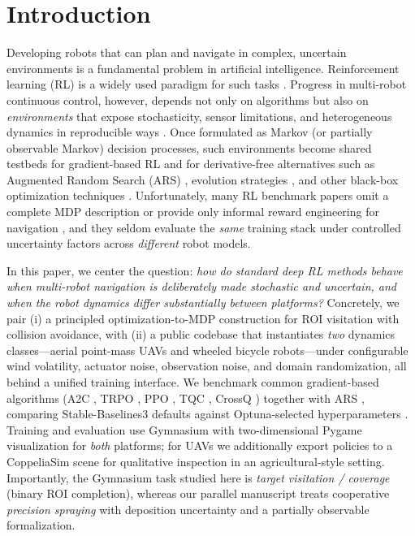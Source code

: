 \documentclass{article}
\begin{document}
\section{Introduction}
\label{sec:intro}
Developing robots that can plan and navigate in complex, uncertain environments is a fundamental problem in artificial intelligence. Reinforcement learning (RL) is a widely used paradigm for such tasks \citep{chen2017icra, everett2018iros, long2017iral, fan2020ijrr, han2022iral}. Progress in multi-robot continuous control, however, depends not only on algorithms but also on \emph{environments} that expose stochasticity, sensor limitations, and heterogeneous dynamics in reproducible ways \citep{brockman2016openai, islam2017reproducibility, mania2018ars, dulacArnold2021, sutton2018reinforcement}. Once formulated as Markov (or partially observable Markov) decision processes, such environments become shared testbeds for gradient-based RL and for derivative-free alternatives such as Augmented Random Search (ARS) \citep{mania2018ars}, evolution strategies \citep{salimans2017}, and other black-box optimization techniques \citep{risi2015neuroevolution}. Unfortunately, many RL benchmark papers omit a complete MDP description \citep{kurach2020google, zhang2019cityflow} or provide only informal reward engineering for navigation \citep{chen2017icra, everett2018iros, long2017iral, fan2020ijrr, han2022iral}, and they seldom evaluate the \emph{same} training stack under controlled uncertainty factors across \emph{different} robot models.

In this paper, we center the question: \emph{how do standard deep RL methods behave when multi-robot navigation is deliberately made stochastic and uncertain, and when the robot dynamics differ substantially between platforms?} Concretely, we pair (i) a principled optimization-to-MDP construction for ROI visitation with collision avoidance, with (ii) a public codebase that instantiates \emph{two} dynamics classes---aerial point-mass UAVs and wheeled bicycle robots---under configurable wind volatility, actuator noise, observation noise, and domain randomization, all behind a unified training interface. We benchmark common gradient-based algorithms (A2C \citep{mnih2016a2c}, TRPO \citep{schulman2015trust}, PPO \citep{schulman2017ppo}, TQC \citep{kuznetsov2020tqc}, CrossQ \citep{bhatt2024crossq}) together with ARS \citep{mania2018ars}, comparing Stable-Baselines3 defaults against Optuna-selected hyperparameters \citep{optuna_2019, henderson2018deep}. Training and evaluation use Gymnasium \citep{towers2024gymnasium} with two-dimensional Pygame visualization for \emph{both} platforms; for UAVs we additionally export policies to a CoppeliaSim scene for qualitative inspection in an agricultural-style setting. Importantly, the Gymnasium task studied here is \emph{target visitation / coverage} (binary ROI completion), whereas our parallel manuscript treats cooperative \emph{precision spraying} with deposition uncertainty and a partially observable formalization.
\end{document}
